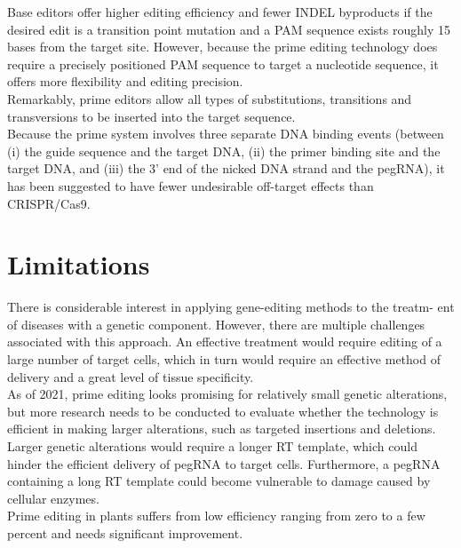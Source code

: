 \documentclass[a4paper,12pt]{extarticle}
\begin{document}
Base editors offer higher editing efficiency and fewer INDEL byproducts if the desired edit is a transition point mutation and a PAM sequence exists roughly 15 bases from the target site. However, because the prime editing technology does require a precisely positioned PAM sequence to target a nucleotide sequence, it offers more flexibility and editing precision.\\

 Remarkably, prime editors allow all types of substitutions, transitions and transversions to be inserted into the target sequence.\\
 
 Because the prime system involves three separate DNA binding events (between (i) the guide sequence and the target DNA, (ii) the primer binding site and the target DNA, and (iii) the 3’ end of the nicked DNA strand and the pegRNA), it has been suggested to have fewer undesirable off-target effects than CRISPR/Cas9.\\
 
\section{Limitations}

There is considerable interest in applying gene-editing methods to the treatm- ent of diseases with a genetic component. However, there are multiple challenges associated with this approach. An effective treatment would require editing of a large number of target cells, which in turn would require an effective method of delivery and a great level of tissue specificity.\\

As of 2021, prime editing looks promising for relatively small genetic alterations, but more research needs to be conducted to evaluate whether the technology is efficient in making larger alterations, such as targeted insertions and deletions. \\

Larger genetic alterations would require a longer RT template, which could hinder the efficient delivery of pegRNA to target cells. Furthermore, a pegRNA containing a long RT template could become vulnerable to damage caused by cellular enzymes.\\

Prime editing in plants suffers from low efficiency ranging from zero to a few percent and needs significant improvement.\\
\end{document}
